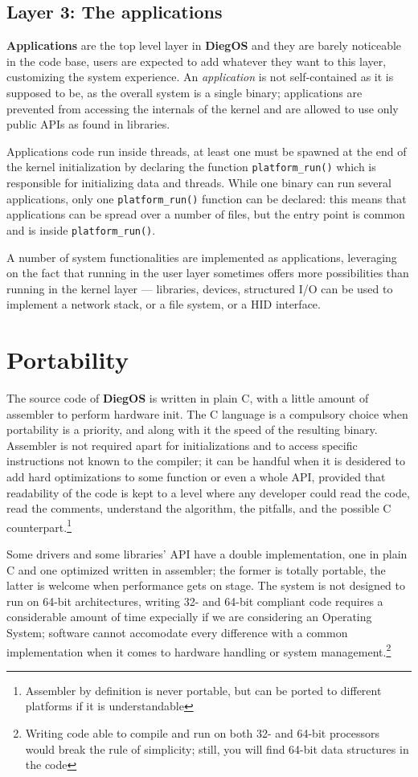 \documentclass[11pt,b5paper]{scrbook}
\newcommand{\myOS}{{\color{SteelBlue}\textbf{DiegOS}}}
\begin{document}
\subsection{Layer 3: The applications}
\textbf{Applications} are the top level layer in {\myOS} and they are
barely noticeable in the code base, users are expected to add whatever they 
want to this layer, customizing the system experience.
An \textit{application} is not self-contained as it is supposed to be, as the
overall system is a single binary; applications are prevented from accessing
the internals of the kernel and are allowed to use only public APIs as found
in libraries.

Applications code run inside threads, at least one must be spawned at the end
of the kernel initialization by declaring the function \texttt{platform\_run()}
which is responsible for initializing data and threads.
While one binary can run several applications, only one \texttt{platform\_run()}
function can be declared: this means that applications
can be spread over a number of files, but the entry point is common and is
inside \texttt{platform\_run()}.

A number of system functionalities are implemented as applications, leveraging on the fact
that running in the user layer sometimes offers more possibilities than running in the kernel layer
--- libraries, devices, structured I/O can be used to implement a network stack, or a file system,
or a HID interface.

\section{Portability}
The source code of {\myOS} is written in plain C, with a little amount of
assembler to perform hardware init.
The C language is a compulsory choice when portability is a priority, and
along with it the speed of the resulting binary.
Assembler is not required apart for initializations and to access specific
instructions not known to the compiler; it can be handful when it is desidered to 
add hard optimizations to some function or even a whole API, provided that readability
of the code is kept to a level where any developer could read the code,
read the comments, understand the algorithm, the pitfalls,
and the possible C counterpart.\footnote{Assembler by definition is never portable, but can be ported
to different platforms if it is understandable}

Some drivers and some libraries' API have a double implementation, one in plain C and 
one optimized written in assembler; the former is totally portable,
the latter is welcome when performance gets on stage.
The system is not designed to run on 64-bit architectures, writing 32- and 64-bit compliant 
code requires a considerable amount of time expecially if we are considering an
Operating System; software cannot accomodate every difference with a common implementation
when it comes to hardware handling or system management.\footnote{
Writing code able to compile and run on both 32- and 64-bit processors would break
the rule of simplicity; still, you will find 64-bit data structures in the code}
\end{document}
